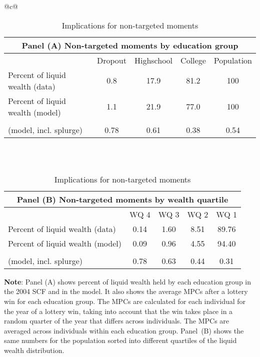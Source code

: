 \documentclass[\econtexRoot/HAFiscal]{subfiles}
\begin{document}
\begin{table}[th]
    \centering
    \begin{tabular*}{\textwidth}{@{\extracolsep{\fill}}c@{}}
        \begin{tabular}{lcccc}
            \multicolumn{5}{c}{Panel (A) Non-targeted moments by education group} \\ \midrule
            & Dropout & Highschool & College & Population \\ \midrule
            Percent of liquid wealth (data) & 0.8 & 17.9 & 81.2 & 100 \\
            Percent of liquid wealth (model) & 1.1 & 21.9 & 77.0 & 100 \\
            \makecell[l]{Avg. lottery-win-year MPC \\ (model, incl. splurge)} & 0.78 & 0.61 & 0.38 & 0.54
            \\ \bottomrule 
        \end{tabular} \\ \\

      \vspace{2em}
      
        \begin{tabular}{lcccc}
            \multicolumn{5}{c}{Panel (B) Non-targeted moments by wealth quartile} \\ \midrule
             & WQ 4 & WQ 3 & WQ 2 & WQ 1 \\ \midrule
            Percent of liquid wealth (data) & 0.14 & 1.60 & 8.51 & 89.76 \\
            Percent of liquid wealth (model) & 0.09 & 0.96 & 4.55 & 94.40 \\
            \makecell[l]{Avg. lottery-win-year MPC \\ (model, incl. splurge)} & 0.78 & 0.63 & 0.44 & 0.31
            \\ \bottomrule 
        \end{tabular}
    \end{tabular*}
    \caption{Implications for non-targeted moments}
    \notinsubfile{\label{tab:nonTargetedMoments}}
    \parbox{16cm}{\small \vspace{.15cm} \textbf{Note}: Panel (A) shows percent of liquid wealth held by each education group in the 2004 SCF and in the model. It also shows the average MPCs after a lottery win for each education group. The MPCs are calculated for each individual for the year of a lottery win, taking into account that the win takes place in a random quarter of the year that differs across individuals. The MPCs are averaged across individuals within each education group. Panel~(B) shows the same numbers for the population sorted into different quartiles of the liquid wealth distribution.\normalsize}
  \end{table}
  
\end{document}
